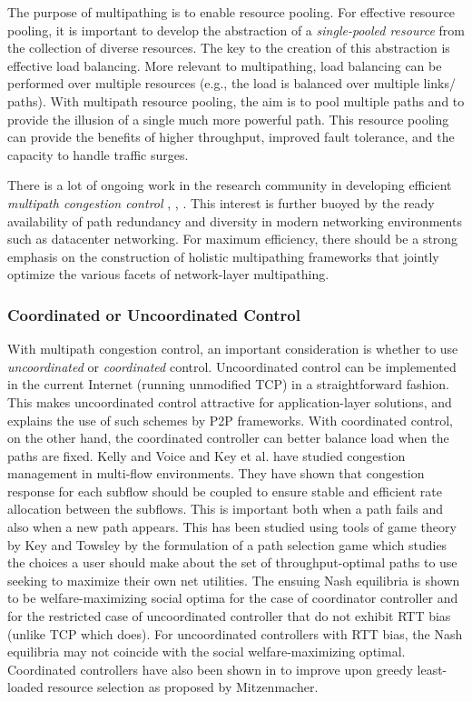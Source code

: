 \documentclass[10pt]{IEEEtran}
\begin{document}
The purpose of multipathing is to enable resource pooling. For effective resource pooling, it is important to develop the abstraction of a \textit{single-pooled resource} from the collection of diverse resources. The key to the creation of this abstraction is effective load balancing. More relevant to multipathing, load balancing can be performed over multiple resources (e.g., the load is balanced over multiple links/ paths). With multipath resource pooling, the aim is to pool multiple paths and to provide the illusion of a single much more powerful path. This resource pooling can provide the benefits of higher throughput, improved fault tolerance, and the capacity to handle traffic surges. 

There is a lot of ongoing work in the research community in developing efficient \emph{multipath congestion control}  \cite{raiciu2009practical}, \cite{key2011path}, \cite{wischik2011design}. This interest is further buoyed by the ready availability of path redundancy and diversity in modern networking environments such as datacenter networking. For maximum efficiency, there should be a strong emphasis on the construction of holistic multipathing frameworks that jointly optimize the various facets of network-layer multipathing.



\vspace{2mm}
\subsubsection{Coordinated or Uncoordinated Control}
With multipath congestion control, an important consideration is whether to use \textit{uncoordinated} or \textit{coordinated} control. Uncoordinated control can be implemented in the current Internet (running unmodified TCP) in a straightforward fashion. This makes uncoordinated control attractive for application-layer solutions, and explains the use of such schemes by P2P frameworks. With coordinated control, on the other hand, the coordinated controller can better balance load when the paths are fixed.  Kelly and Voice \cite{kelly2005stability} and Key et al. \cite{key2007path} have studied congestion management in multi-flow environments. They have shown that congestion response for each subflow should be coupled to ensure stable and efficient rate allocation between the subflows. This is important both when a path fails and also when a new path appears. This has been studied using tools of game theory by Key and Towsley \cite{key2011path} by the formulation of a path selection game which studies the choices a user should make about the set of throughput-optimal paths to use seeking to maximize their own net utilities. The ensuing Nash equilibria is shown to be welfare-maximizing social optima for the case of coordinator controller and for the restricted case of uncoordinated controller that do not exhibit RTT bias (unlike TCP which does). For uncoordinated controllers with RTT bias, the Nash equilibria may not coincide with the social welfare-maximizing optimal. Coordinated controllers have also been shown in \cite{key2011path} to improve upon greedy least-loaded resource selection as proposed by Mitzenmacher.
\end{document}
